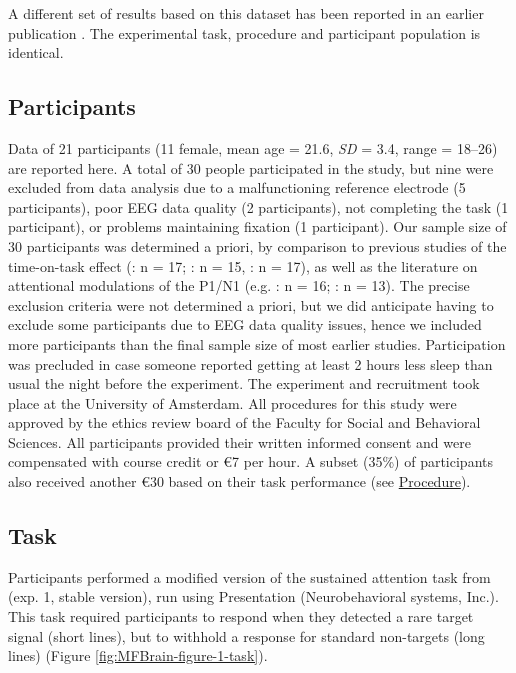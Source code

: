 \documentclass[11pt,]{memoir}
\begin{document}
A different set of results based on this dataset has been reported in an earlier publication \autocite{Slagter2016}. The experimental task, procedure and participant population is identical.

\hypertarget{participants-1}{%
\subsection{Participants}\label{participants-1}}

Data of 21 participants (11 female, mean age = 21.6, \emph{SD} = 3.4, range = 18--26) are reported here. A total of 30 people participated in the study, but nine were excluded from data analysis due to a malfunctioning reference electrode (5 participants), poor EEG data quality (2 participants), not completing the task (1 participant), or problems maintaining fixation (1 participant). Our sample size of 30 participants was determined a priori, by comparison to previous studies of the time-on-task effect (\textcite{MacLean2009}: n = 17; \textcite{Lorist2009}: n = 15, \textcite{Boksem2005}: n = 17), as well as the literature on attentional modulations of the P1/N1 (e.g. \textcite{Talsma2007}: n = 16; \textcite{Grent2007}: n = 13). The precise exclusion criteria were not determined a priori, but we did anticipate having to exclude some participants due to EEG data quality issues, hence we included more participants than the final sample size of most earlier studies. Participation was precluded in case someone reported getting at least 2 hours less sleep than usual the night before the experiment. The experiment and recruitment took place at the University of Amsterdam. All procedures for this study were approved by the ethics review board of the Faculty for Social and Behavioral Sciences. All participants provided their written informed consent and were compensated with course credit or €7 per hour. A subset (35\%) of participants also received another €30 based on their task performance (see \protect\hyperlink{procedure-1}{Procedure}).

\hypertarget{task}{%
\subsection{Task}\label{task}}

Participants performed a modified version of the sustained attention task from \textcite{MacLean2009} (exp. 1, stable version), run using Presentation (Neurobehavioral systems, Inc.). This task required participants to respond when they detected a rare target signal (short lines), but to withhold a response for standard non-targets (long lines) (Figure \ref{fig:MFBrain-figure-1-task}).
\end{document}
